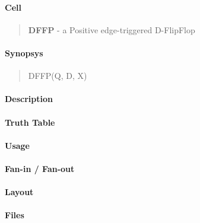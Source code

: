 \label{DFFP}
\paragraph{Cell}
\begin{quote}
    \textbf{DFFP} - a Positive edge-triggered D-FlipFlop
\end{quote}

\paragraph{Synopsys}
\begin{quote}
    DFFP(Q, D, X)
\end{quote}

\paragraph{Description}

%

\paragraph{Truth Table}
%

\paragraph{Usage}

\paragraph{Fan-in / Fan-out}

\paragraph{Layout}

\paragraph{Files}

\clearpage
